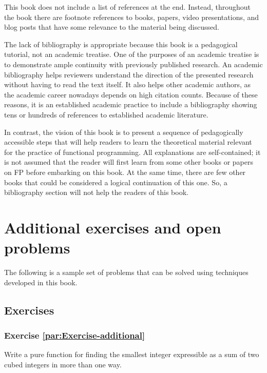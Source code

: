 This book does not include a list of references at the end. Instead,
throughout the book there are footnote references to books, papers,
video presentations, and blog posts that have some relevance to the
material being discussed. 

The lack of bibliography is appropriate because this book is a pedagogical
tutorial, not an academic treatise. One of the purposes of an academic
treatise is to demonstrate ample continuity with previously published
research. An academic bibliography helps reviewers understand the
direction of the presented research without having to read the text
itself. It also helps other academic authors, as the academic career
nowadays depends on high citation counts. Because of these reasons,
it is an established academic practice to include a bibliography showing
tens or hundreds of references to established academic literature.

In contrast, the vision of this book is to present a sequence of pedagogically
accessible steps that will help readers to learn the theoretical material
relevant for the practice of functional programming. All explanations
are self-contained; it is not assumed that the reader will first learn
from some other books or papers on FP before embarking on this book.
At the same time, there are few other books that could be considered
a logical continuation of this one. So, a bibliography section will
not help the readers of this book.

\section{Additional exercises and open problems\label{chap:Exercises-in-AFTT}}

The following is a sample set of problems that can be solved using
techniques developed in this book.

\subsection{Exercises}

\subsubsection{Exercise \label{par:Exercise-additional}\ref{par:Exercise-additional}}

Write a pure function for finding the smallest integer expressible
as a sum of two cubed integers in more than one way.

